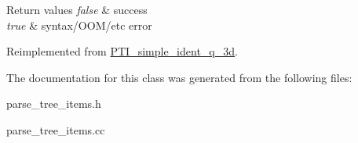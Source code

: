 \begin{DoxyRetVals}{Return values}
{\em false} & success \\
\hline
{\em true} & syntax/\+O\+O\+M/etc error \\
\hline
\end{DoxyRetVals}


Reimplemented from \mbox{\hyperlink{classPTI__simple__ident__q__3d_ad94d0e373c6cb86832c3206b706eaf0b}{P\+T\+I\+\_\+simple\+\_\+ident\+\_\+q\+\_\+3d}}.



The documentation for this class was generated from the following files\+:\begin{DoxyCompactItemize}
\item 
parse\+\_\+tree\+\_\+items.\+h\item 
parse\+\_\+tree\+\_\+items.\+cc\end{DoxyCompactItemize}
